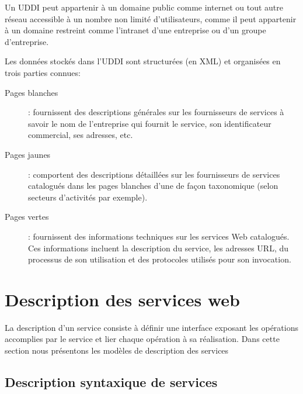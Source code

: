 	Un \textsc{UDDI} peut appartenir à un domaine public comme internet ou tout autre réseau accessible à un nombre
       	non limité d’utilisateurs, comme il peut appartenir à un domaine restreint comme l'intranet d’une entreprise 
	ou d'un groupe d'entreprise.

	Les données stockés dans l'UDDI sont structurées (en \textsc{XML}) et organisées en trois parties 
	connues:

	\begin{description} %
	    \item[Pages blanches]:
		fournissent des descriptions générales sur les fournisseurs de services à savoir le nom de 
		l'entreprise qui fournit le service, son identificateur commercial, ses adresses, etc.

	    \item[Pages jaunes]:
		comportent des descriptions détaillées sur les fournisseurs de services catalogués dans les pages 
		blanches d'une de façon taxonomique (selon secteurs d'activités par exemple).

	    \item[Pages vertes]:
		fournissent des informations techniques sur les services Web catalogués. Ces informations incluent 
		la description du service, les adresses \textsc{URL}, du processus de son utilisation 
		et des protocoles utilisés pour son invocation.

	\end{description}


\section{Description des services web} 
    La description d’un service consiste à définir une interface exposant les opérations accomplies par le service et 
    lier chaque opération à sa réalisation. Dans cette section nous présentons les modèles de description des services

    \cite{medjahed2004thesis}
    	\subsection{Description syntaxique de services}

